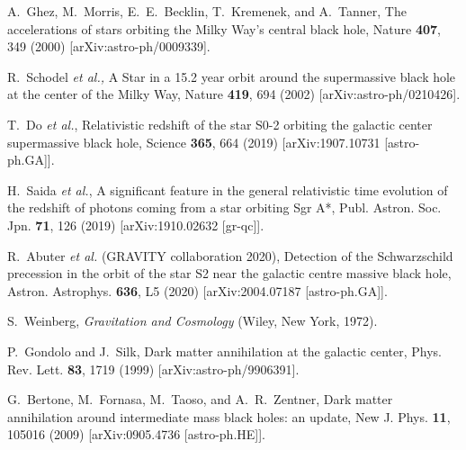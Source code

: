 \documentclass[aps,11pt,nofootinbib,preprintnumbers,groupedaddress,superscriptaddress]{revtex4-2}
\begin{document}
\begin{thebibliography}{99}

%
A.~Ghez, M.~Morris, E.~E.~Becklin, T.~Kremenek, and A.~Tanner,
The accelerations of stars orbiting the Milky Way's central black hole,
Nature \textbf{407}, 349 (2000)
[arXiv:astro-ph/0009339].

%
R.~Schodel
\textit{et al.,}
A Star in a 15.2 year orbit around the supermassive black hole at the center of the Milky Way,
Nature \textbf{419}, 694 (2002)
[arXiv:astro-ph/0210426].

%
T.~Do \textit{et al.}, 
Relativistic redshift of the star S0-2 orbiting the galactic center supermassive black hole,
Science \textbf{365}, 664 (2019)
[arXiv:1907.10731 [astro-ph.GA]].

%
H.~Saida \textit{et al.},
A significant feature in the general relativistic time evolution of the redshift of photons coming from a star orbiting Sgr A*,
Publ. Astron. Soc. Jpn. \textbf{71}, 126 (2019)
[arXiv:1910.02632 [gr-qc]].

%
R.~Abuter \textit{et al.} (GRAVITY collaboration 2020),
Detection of the Schwarzschild precession in the orbit of the star S2 near the galactic centre massive black hole,
Astron. Astrophys. \textbf{636}, L5 (2020)
[arXiv:2004.07187 [astro-ph.GA]].

%
S.~Weinberg, 
\textit{Gravitation and Cosmology}
(Wiley, New York, 1972).

%
P.~Gondolo and J.~Silk,
Dark matter annihilation at the galactic center,
Phys. Rev. Lett. \textbf{83}, 1719 %
(1999)
[arXiv:astro-ph/9906391].

%
G.~Bertone, M.~Fornasa, M.~Taoso, and A.~R.~Zentner,
Dark matter annihilation around intermediate mass black holes: an update,
New J. Phys. \textbf{11}, 105016 (2009)
[arXiv:0905.4736 [astro-ph.HE]].


\end{thebibliography}
\end{document}
